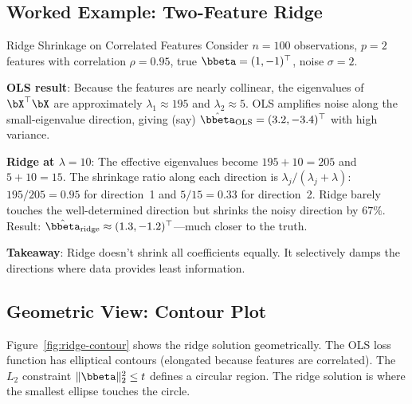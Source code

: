 \subsection{Worked Example: Two-Feature Ridge}

\begin{workedexample}{Ridge Shrinkage on Correlated Features}
Consider $n = 100$ observations, $p = 2$ features with correlation $\rho = 0.95$, true $\bbeta = (1, -1)^\top$, noise $\sigma = 2$.

\textbf{OLS result}: Because the features are nearly collinear, the eigenvalues of $\bX^\top\bX$ are approximately $\lambda_1 \approx 195$ and $\lambda_2 \approx 5$.
OLS amplifies noise along the small-eigenvalue direction, giving (say) $\hat{\bbeta}_{\mathrm{OLS}} = (3.2, -3.4)^\top$ with high variance.

\textbf{Ridge at $\lambda = 10$}: The effective eigenvalues become $195 + 10 = 205$ and $5 + 10 = 15$.
The shrinkage ratio along each direction is $\lambda_j / (\lambda_j + \lambda)$: $195/205 = 0.95$ for direction~1 and $5/15 = 0.33$ for direction~2.
Ridge barely touches the well-determined direction but shrinks the noisy direction by $67\%$.
Result: $\hat{\bbeta}_{\mathrm{ridge}} \approx (1.3, -1.2)^\top$---much closer to the truth.

\textbf{Takeaway}: Ridge doesn't shrink all coefficients equally.
It selectively damps the directions where data provides least information.
\end{workedexample}

\subsection{Geometric View: Contour Plot}

Figure~\ref{fig:ridge-contour} shows the ridge solution geometrically. The OLS loss function has elliptical contours (elongated because features are correlated). The $L_2$ constraint $\|\bbeta\|_2^2 \leq t$ defines a circular region. The ridge solution is where the smallest ellipse touches the circle.

